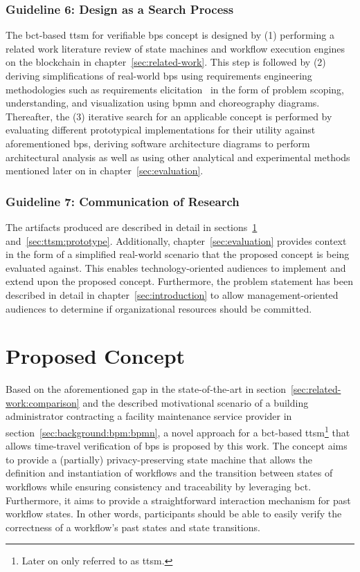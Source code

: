 \subsubsection{Guideline 6: Design as a Search Process}
\label{sec:ttsm:methodology:gl6}
The \gls{bct}-based \gls{ttsm} for verifiable \glspl{bp} concept is designed by (1) performing a related work literature review of state machines and workflow execution engines on the blockchain in chapter~\ref{sec:related-work}. This step is followed by (2) deriving simplifications of real-world \glspl{bp} using requirements engineering methodologies such as requirements elicitation~\cite{christel1992_requirements_elicitation} in the form of problem scoping, understanding, and visualization using \gls{bpmn} and choreography diagrams. Thereafter, the (3) iterative search for an applicable concept is performed by evaluating different prototypical implementations for their utility against aforementioned \glspl{bp}, deriving software architecture diagrams to perform architectural analysis as well as using other analytical and experimental methods mentioned later on in chapter~\ref{sec:evaluation}.

\subsubsection{Guideline 7: Communication of Research}
\label{sec:ttsm:methodology:gl7}
The artifacts produced are described in detail in sections~\ref{sec:ttsm:proposal} and~\ref{sec:ttsm:prototype}. Additionally, chapter~\ref{sec:evaluation} provides context in the form of a simplified real-world scenario that the proposed concept is being evaluated against. This enables technology-oriented audiences to implement and extend upon the proposed concept. Furthermore, the problem statement has been described in detail in chapter~\ref{sec:introduction} to allow management-oriented audiences to determine if organizational resources should be committed.



\section{Proposed Concept}
\label{sec:ttsm:proposal}
Based on the aforementioned gap in the state-of-the-art in section~\ref{sec:related-work:comparison} and the described motivational scenario of a building administrator contracting a facility maintenance service provider in section~\ref{sec:background:bpm:bpmn}, a novel approach for a \gls{bct}-based \gls{ttsm}\footnote{Later on only referred to as \gls{ttsm}.} that allows time-travel verification of \glspl{bp} is proposed by this work. The concept aims to provide a (partially) privacy-preserving state machine that allows the definition and instantiation of workflows and the transition between states of workflows while ensuring consistency and traceability by leveraging \gls{bct}. Furthermore, it aims to provide a straightforward interaction mechanism for past workflow states. In other words, participants should be able to easily verify the correctness of a workflow's past states and state transitions.

